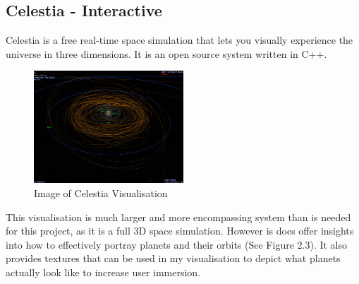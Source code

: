 \subsection{Celestia - Interactive}
Celestia \cite{celestia} is a free real-time space simulation that lets you visually experience the universe in three dimensions. It is an open source system written in C++. 
\begin{figure}[h!]
  \centering
      \includegraphics[width=0.5\textwidth]{images/celestia.jpg}
  \caption{Image of Celestia Visualisation}
\end{figure}
This visualisation is much larger and more encompassing system than is needed for this project, as it is a full 3D space simulation. However is does offer insights into how to effectively portray planets and their orbits (See Figure 2.3). It also provides textures that can be used in my visualisation to depict what planets actually look like to increase user immersion.

